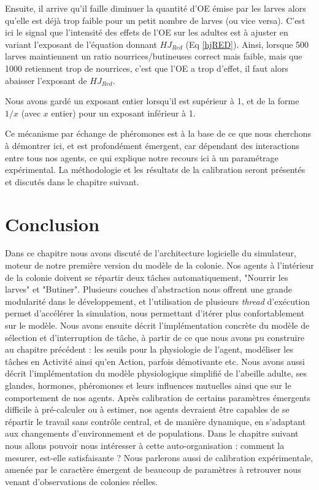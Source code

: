 	Ensuite, il arrive qu'il faille diminuer la quantité d'OE émise par les larves alors qu'elle est déjà trop faible pour un petit nombre de larves (ou vice versa). C'est ici le signal que l'intensité des effets de l'OE sur les adultes est à ajuster en variant l'exposant de l'équation donnant $HJ_{Red}$ (Eq \ref{hjRED}). Ainsi, lorsque 500 larves maintiennent un ratio nourrices/butineuses correct mais faible, mais que 1000 retiennent trop de nourrices, c'est que l'OE a trop d'effet, il faut alors abaisser l'exposant de $HJ_{Red}$. 
	
	Nous avons gardé un exposant entier lorsqu'il est supérieur à 1, et de la forme $1/x$ (avec $x$ entier) pour un exposant inférieur à 1.
	
	
	Ce mécanisme par échange de phéromones est à la base de ce que nous cherchons à démontrer ici, et est profondément émergent, car dépendant des interactions entre tous nos agents, ce qui explique notre recours ici à un paramétrage expérimental. La méthodologie et les résultats de la calibration seront présentés et discutés dans le chapitre suivant.
			
	\section*{Conclusion}
		Dans ce chapitre nous avons discuté de l'architecture logicielle du simulateur, moteur de notre première version du modèle de la colonie. Nos agents à l'intérieur de la colonie doivent se répartir deux tâches automatiquement, "Nourrir les larves" et "Butiner". Plusieurs couches d'abstraction nous offrent une grande modularité dans le développement, et l'utilisation de plusieurs \textit{thread} d'exécution permet d'accélérer la simulation, nous permettant d'itérer plus confortablement sur le modèle. Nous avons ensuite décrit l'implémentation concrète du modèle de sélection et d'interruption de tâche, à partir de ce que nous avons pu construire au chapitre précédent : les seuils pour la physiologie de l'agent, modéliser les tâches en Activité ainsi qu'en Action, parfois démotivante etc. Nous avons aussi décrit l'implémentation du modèle physiologique simplifié de l'abeille adulte, ses glandes, hormones, phéromones et leurs influences mutuelles ainsi que sur le comportement de nos agents. Après calibration de certains paramètres émergents difficile à pré-calculer ou à estimer, nos agents devraient être capables de se répartir le travail sans contrôle central, et de manière dynamique, en s'adaptant aux changements d'environnement et de populations. Dans le chapitre suivant nous allons pouvoir nous intéresser à cette auto-organisation : comment la mesurer, est-elle satisfaisante ? Nous parlerons aussi de calibration expérimentale, amenée par le caractère émergent de beaucoup de paramètres à retrouver nous venant d'observations de colonies réelles.
		
		
		
		
		
		
		
		
		
		
		
		
		
		
		
		
		
		
		
		
		
		
		
		
	